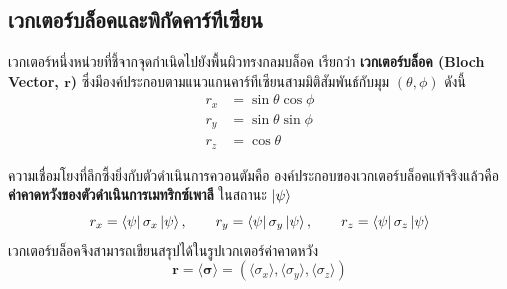 \subsection{เวกเตอร์บล็อคและพิกัดคาร์ทีเซียน}
เวกเตอร์หนึ่งหน่วยที่ชี้จากจุดกำเนิดไปยังพื้นผิวทรงกลมบล็อค เรียกว่า \textbf{เวกเตอร์บล็อค (Bloch Vector, $\mathbf{r}$)} ซึ่งมีองค์ประกอบตามแนวแกนคาร์ทีเซียนสามมิติสัมพันธ์กับมุม $(\theta, \phi)$ ดังนี้
\begin{align}
r_x &= \sin\theta \cos\phi \label{eq:bloch_rx} \\
r_y &= \sin\theta \sin\phi \label{eq:bloch_ry} \\
r_z &= \cos\theta \label{eq:bloch_rz}
\end{align}

ความเชื่อมโยงที่ลึกซึ้งยิ่งกับตัวดำเนินการควอนตัมคือ องค์ประกอบของเวกเตอร์บล็อคแท้จริงแล้วคือ \textbf{ค่าคาดหวังของตัวดำเนินการเมทริกซ์เพาลี} ในสถานะ $\ket{\psi}$
\begin{equation}
r_x = \bra{\psi} \sigma_x \ket{\psi}, \qquad r_y = \bra{\psi} \sigma_y \ket{\psi}, \qquad r_z = \bra{\psi} \sigma_z \ket{\psi}
\label{eq:bloch_vector_pauli_exp}
\end{equation}
เวกเตอร์บล็อคจึงสามารถเขียนสรุปได้ในรูปเวกเตอร์ค่าคาดหวัง
\begin{equation}
\mathbf{r} = \langle \boldsymbol{\sigma} \rangle = (\langle\sigma_x\rangle, \langle\sigma_y\rangle, \langle\sigma_z\rangle)
\end{equation}

